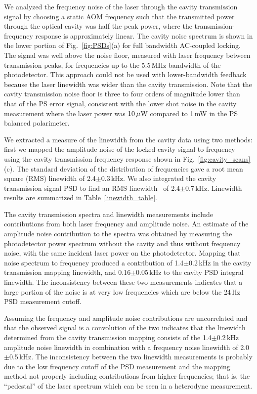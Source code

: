 \documentclass[10pt,letterpaper]{article}
\begin{document}
We analyzed the frequency noise of the laser through the cavity transmission signal by choosing a static AOM frequency such that the transmitted power through the optical cavity was half the peak power, where the transmission-frequency response is approximately linear.
The cavity noise spectrum is shown in the lower portion of Fig.~\ref{fig:PSDs}(a) for full bandwidth AC-coupled locking.
The signal was well above the noise floor, measured with laser frequency between transmission peaks, for frequencies up to the 5.5\,MHz bandwidth of the photodetector.
This approach could not be used with lower-bandwidth feedback because the laser linewidth was wider than the cavity transmission.
Note that the cavity transmission noise floor is three to four orders of magnitude lower than that of the PS error signal, consistent with the lower shot noise in the cavity measurement where the laser power was $10\rm\,\mu$W compared to 1\,mW in the PS balanced polarimeter.

We extracted a measure of the linewidth from the cavity data using two methods: first we mapped the amplitude noise of the locked cavity signal to frequency using the cavity transmission frequency response shown in Fig.~\ref{fig:cavity_scans}(c).
The standard deviation of the distribution of frequencies gave a root mean square (RMS) linewidth of 2.4$\pm$0.3\,kHz.
We also integrated the cavity transmission signal PSD to find an RMS linewidth~\cite{negnevitsky_wideband_2013} of 2.4$\pm$0.7\,kHz.
Linewidth results are summarized in Table \ref{linewidth_table}.

The cavity transmission spectra and linewidth measurements include contributions from both laser frequency and amplitude noise.
An estimate of the amplitude noise contribution to the spectra was obtained by measuring the photodetector power spectrum without the cavity and thus without frequency noise, with the same incident laser power on the photodetector.
Mapping that noise spectrum to frequency produced a contribution of 1.4$\pm$0.2\,kHz in the cavity transmission mapping linewidth,  and 0.16$\pm$0.05\,kHz to the cavity PSD integral linewidth.
The inconsistency between these two measurements indicates that a large portion of the noise is at very low frequencies which are below the 24\,Hz PSD measurement cutoff.

Assuming the frequency and amplitude noise contributions are uncorrelated and that the observed signal is a convolution of the two indicates that the linewidth determined from the cavity transmission mapping consists of the 1.4$\pm$0.2\,kHz amplitude noise linewidth in combination with a frequency noise linewidth of 2.0$\pm$0.5\,kHz.
The inconsistency between the two linewidth measurements is probably due to the low frequency cutoff of the PSD measurement and the mapping method not properly including contributions from higher frequencies; that is, the ``pedestal'' of the laser spectrum which can be seen in a heterodyne measurement.
\end{document}
